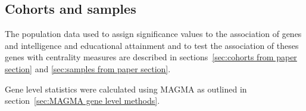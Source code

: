 














\subsection{Cohorts and samples}
\label{Centrality:cohorts and samples}

The population data used to assign significance values to the association of genes and intelligence and educational attainment and to test the association of theses genes with centrality measures are described in sections~\ref{sec:cohorts from paper section} and \ref{sec:samples from paper section}.

Gene level statistics were calculated using MAGMA as outlined in section~\ref{sec:MAGMA gene level methods}.










